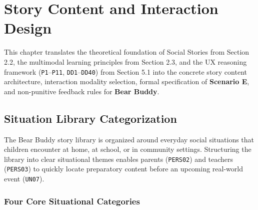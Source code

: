 \chapter{Story Content and Interaction Design}


This chapter translates the theoretical foundation of Social Stories from Section 2.2, the multimodal learning principles from Section 2.3, and the UX reasoning framework (\texttt{P1}–\texttt{P11}, \texttt{DD1}–\texttt{DD40}) from Section 5.1 into the concrete story content architecture, interaction modality selection, formal specification of \textbf{Scenario E}, and non-punitive feedback rules for \textbf{Bear Buddy}.


\section{Situation Library Categorization}


The Bear Buddy story library is organized around everyday social situations that children encounter at home, at school, or in community settings. Structuring the library into clear situational themes enables parents (\texttt{PERS02}) and teachers (\texttt{PERS03}) to quickly locate preparatory content before an upcoming real-world event (\texttt{UN07}).


\subsection{Four Core Situational Categories}


